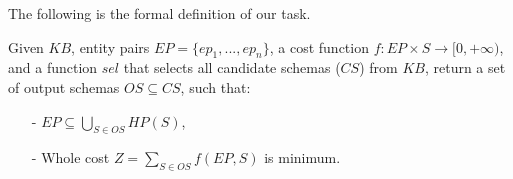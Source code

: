 The following is the formal definition of our task.

\begin{defn}
\label{def:pp}
Given $KB$, entity pairs $EP = \{ep_1, ..., ep_n\}$,
a cost function $f: EP \times S \rightarrow [0, +\infty)$,
and a function $sel$ that selects all candidate schemas ($CS$) from $KB$,
return a set of output schemas $OS \subseteq CS$, such that:
\begin{itemize}
    \item[-] $EP \subseteq \bigcup_{S \in OS} HP(S)$,
    \item[-] Whole cost $Z = \sum\nolimits_{S \in OS} f(EP, S)$ is minimum.
\end{itemize}
%
\end{defn}


%
%


